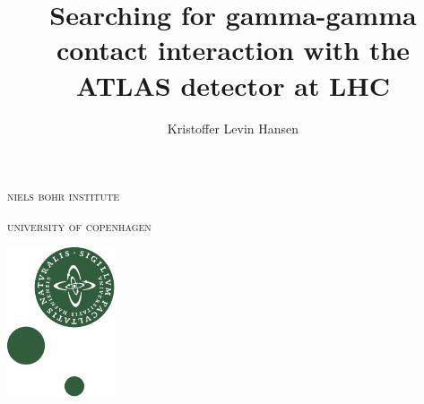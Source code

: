 


\renewcommand{\chapnumfont}{\LARGE\sffamily}
\renewcommand{\printchapternum}{\chapnumfont \colorbox{natgreen}{\textcolor{white}{\hspace{.2em}\thechapter\hspace{.2em}}}\hspace{1em}}


\author{Kristoffer Levin Hansen}
\title{Searching for gamma-gamma contact interaction with the ATLAS detector at LHC}

\hypersetup{pdfpagelayout=TwoColumnRight,pdfdisplaydoctitle=true}


\begin{english}

\begin{titlingpage}{
\thispagestyle{empty}
\newlength{\topma}\setlength{\topma}{-1in}\addtolength{\topma}{-\headsep}\addtolength{\topma}{-\voffset}\addtolength{\topma}{11mm}
\newlength{\sidema}\setlength{\sidema}{-1in}\addtolength{\sidema}{-\hoffset}\addtolength{\sidema}{-\oddsidemargin}\addtolength{\sidema}{-\marginparsep}\addtolength{\sidema}{15mm}
\newlength{\textwa}\setlength{\textwa}{\paperwidth}\addtolength{\textwa}{-35mm}\addtolength{\textwa}{-\textwidth}
\newlength{\textha}\setlength{\textha}{-\textheight}\addtolength{\textha}{\paperheight}\addtolength{\textha}{-11mm}\addtolength{\textha}{-.1\paperheight}
\changepage{\textha}{\textwa}{}{\sidema}{}{-\topmargin}{-\headheight}{\topma}{}
\noindent\begin{minipage}[t]{.8\textwidth}
\noindent\raggedright \textcolor{kugray}{\fontsize{17}{17}\selectfont\textsc{niels bohr institute}}

\vspace{.2em}\textcolor{kugray}{\fontsize{14}{17}\selectfont\textsc{university of copenhagen}}
\end{minipage}\hfill\begin{minipage}[t]{32mm}\raggedleft \vspace{16mm} \includegraphics[height=44mm]{KUnat.pdf}
\end{minipage}


}
\end{titlingpage}
\end{english}
